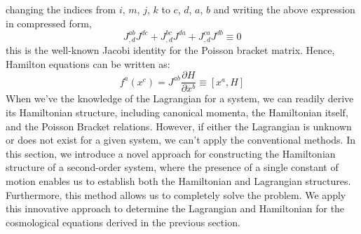 \documentclass[12pt]{article}
\begin{document}
changing the indices from $i$, $m$, $j$, $k$ to $c$, $d$, $a$, $b$ and writing the above expression in compressed form,
\begin{equation}
J_{, d}^{a b} J^{d c}+J_{, d}^{b c} J^{d a}+J_{, d}^{c a} J^{d b} \equiv 0
\end{equation}
this is the well-known Jacobi identity for the Poisson bracket matrix. Hence, Hamilton equations can be written as:
\begin{equation}
f^{a}\left(x^{c}\right)=J^{a b} \frac{\partial H}{\partial x^{b}} \equiv\left[x^{a}, H\right]
\end{equation}
When we've the knowledge of the Lagrangian for a system, we can readily derive its Hamiltonian structure, including canonical momenta, the Hamiltonian itself, and the Poisson Bracket relations. However, if either the Lagrangian is unknown or does not exist for a given system, we can't apply the conventional methods.
In this section, we introduce a novel approach for constructing the Hamiltonian structure of a second-order system, where the presence of a single constant of motion enables us to establish both the Hamiltonian and Lagrangian structures. Furthermore, this method allows us to completely solve the problem. We apply this innovative approach to determine the Lagrangian and Hamiltonian for the cosmological equations derived in the previous section.
\end{document}
